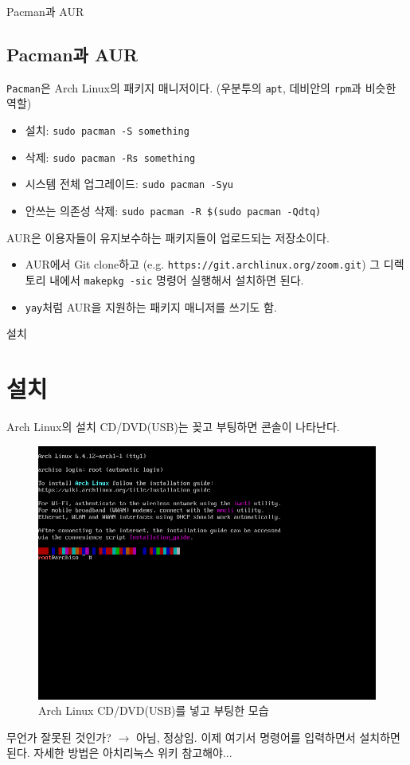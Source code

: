 \documentclass{beamer}
\begin{document}
\begin{frame}{Pacman과 AUR}
    \subsection{Pacman과 AUR}
    \texttt{Pacman}은 Arch Linux의 패키지 매니저이다. (우분투의 \texttt{apt}, 데비안의 \texttt{rpm}과 비슷한 역할)
    \begin{itemize}
        \item 설치: \texttt{sudo pacman -S something}
        \item 삭제: \texttt{sudo pacman -Rs something}
        \item 시스템 전체 업그레이드: \texttt{sudo pacman -Syu}
        \item 안쓰는 의존성 삭제: \texttt{sudo pacman -R \$(sudo pacman -Qdtq)}
    \end{itemize}

    AUR은 이용자들이 유지보수하는 패키지들이 업로드되는 저장소이다.
    \begin{itemize}
     \item AUR에서 Git clone하고 (e.g. \texttt{https://git.archlinux.org/zoom.git}) 그 디렉토리 내에서 \texttt{makepkg -sic} 명령어 실행해서 설치하면 된다.
     \item \texttt{yay}처럼 AUR을 지원하는 패키지 매니저를 쓰기도 함.
    \end{itemize}

\end{frame}


\begin{frame}{설치}
    \section{설치}
    Arch Linux의 설치 CD/DVD(USB)는 꽂고 부팅하면 콘솔이 나타난다.
    \begin{figure}
        \includegraphics[scale=0.25]{archlinux iso boot.png}
        \caption{Arch Linux CD/DVD(USB)를 넣고 부팅한 모습}
    \end{figure}
    무언가 잘못된 것인가? $ \rightarrow $ 아님, 정상임. 이제 여기서 명령어를 입력하면서 설치하면 된다.
    자세한 방법은 아치리눅스 위키 참고해야...
\end{frame}
\end{document}
